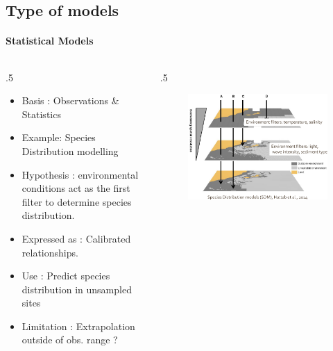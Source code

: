 \documentclass[final,xcolor=dvipsnames]{beamer}
\begin{document}
      \subsection{Type of models}
      \begin{frame}
	\framesubtitle{Statistical Models}
	\begin{columns}
	  \begin{column}{.5\framewidth}
	    \begin{itemize}
	      \item Basis : Observations \& Statistics
	      \item Example: Species Distribution modelling
	      \item Hypothesis : environmental conditions act as
	      the first filter to determine species distribution.
	      \item Expressed as : Calibrated relationships.
	      \item Use : Predict species distribution in unsampled sites 
	      \item Limitation : Extrapolation outside of obs. range ? 
	    \end{itemize}
	  \end{column}
	  \begin{column}{.5\framewidth}
	    \begin{figure}
	      \includegraphics[width=.95\columnwidth]{SDM}
	    \end{figure}
	  \end{column}
	\end{columns}
      \end{frame}
      
\end{document}
